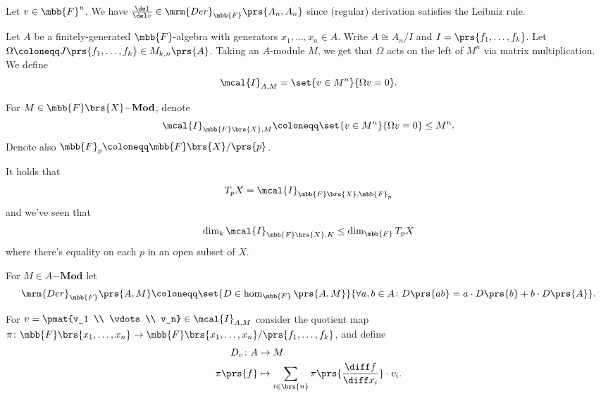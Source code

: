 \documentclass[10pt,a4paper,twoside,openany,hidelinks]{book}
\begin{document}
\begin{example}
Let $v \in \mbb{F}^n$. We have $\frac{\del}{\del v} \in \mrm{Der}_{\mbb{F}}\prs{A_n, A_n}$ since (regular) derivation satisfies the Leibniz rule.
\end{example}

\begin{definition}
Let $A$ be a finitely-generated $\mbb{F}$-algebra with generators $x_1, \ldots, x_n \in A$. Write $A \cong A_n / I$ and $I = \prs{f_1, \ldots, f_k}$.
Let $\Omega \coloneqq J\prs{f_1, \ldots, f_k} \in M_{k,n}\prs{A}$.
Taking an $A$-module $M$, we get that
$\Omega$ acts on the left of $M^n$ via matrix multiplication.
We define
\[\mcal{I}_{A,M} = \set{v \in M^n}{\Omega v = 0} \text{.}\]
\end{definition}


\begin{notation}
For $M \in \mbb{F}\brs{X}\mathbf{-Mod}$, denote
\begin{align*}
\mcal{I}_{\mbb{F}\brs{X}, M} \coloneqq \set{v \in M^n}{\Omega v = 0} \leq M^n \text{.}
\end{align*}
Denote also $\mbb{F}_p \coloneqq \mbb{F}\brs{X} / \prs{p}$.
\end{notation}

\begin{remark}
It holds that
\[T_p X = \mcal{I}_{\mbb{F}\brs{X}, \mbb{F}_p}\]
and we've seen that
\[\dim_k \mcal{I}_{\mbb{F}\brs{X}, K} \leq \dim_{\mbb{F}} T_p X\]
where there's equality on each $p$ in an open subset of $X$.
\end{remark}

\begin{definition}
For $M \in A\mathbf{-Mod}$ let
\begin{align*}
\mrm{Der}_{\mbb{F}}\prs{A,M} \coloneqq \set{D \in \hom_{\mbb{F}}\prs{A,M}}{
\forall a,b \in A \colon D\prs{ab} = a \cdot D\prs{b} + b \cdot D\prs{A}
} \text{.}
\end{align*}
\end{definition}

\begin{definition}
For $v = \pmat{v_1 \\ \vdots \\ v_n} \in \mcal{I}_{A,M}$ consider the quotient map $\pi \colon \mbb{F}\brs{x_1, \ldots, x_n} \to \mbb{F}\brs{x_1, \ldots, x_n}/\prs{f_1, \ldots, f_k}$, and define
\begin{align*}
D_v \colon A &\to M \\
\pi\prs{f} &\mapsto \sum_{i \in \brs{n}}\pi\prs{\frac{\diff f}{\diff x_i}} \cdot v_i \text{.}
\end{align*}
\end{definition}
\end{document}
